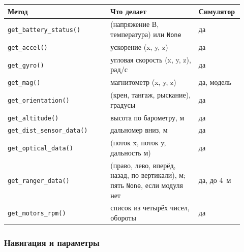 {\footnotesize
\begin{longtable}{@{}>{\raggedright\arraybackslash}p{0.42\linewidth}>{\raggedright\arraybackslash}p{0.36\linewidth}>{\raggedright\arraybackslash}p{0.14\linewidth}@{}}
\toprule
\textbf{Метод} & \textbf{Что делает} & \textbf{Симулятор} \\
\midrule
\endhead
\verb|get_battery_status()| & (напряжение В, температура) или \verb|None| & да \\
\verb|get_accel()| & ускорение (x, y, z) & да \\
\verb|get_gyro()| & угловая скорость (x, y, z), рад/с & да \\
\verb|get_mag()| & магнитометр (x, y, z) & да, модель \\
\verb|get_orientation()| & (крен, тангаж, рыскание), градусы & да \\
\verb|get_altitude()| & высота по барометру, м & да \\
\verb|get_dist_sensor_data()| & дальномер вниз, м & да \\
\verb|get_optical_data()| & (поток x, поток y, дальность м) & да \\
\verb|get_ranger_data()| & (право, лево, вперёд, назад, по вертикали), м; пять \verb|None|, если модуля нет & да, до 4~м \\
\verb|get_motors_rpm()| & список из четырёх чисел, обороты & да \\
\bottomrule
\end{longtable}
}

\subsubsection*{Навигация и параметры}

